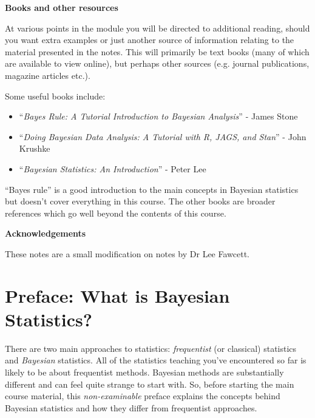 \clearpage
\noindent \textbf{\color{verydarkred}Books and other resources}

At various points in the module you will be directed to additional reading, should you want extra examples or just another source of information relating to the material presented in the notes.  This will primarily be text books (many of which are available to view online), but perhaps other sources (e.g. journal publications, magazine articles etc.).  

\noindent Some useful books include:
\begin{itemize}
\item ``\textit{Bayes Rule: A Tutorial Introduction to Bayesian Analysis}'' - James Stone
\item ``\textit{Doing Bayesian Data Analysis: A Tutorial with R, JAGS, and Stan}'' - John Krushke
\item ``\textit{Bayesian Statistics: An Introduction}'' - Peter Lee
\end{itemize}
``Bayes rule'' is a good introduction to the main concepts in Bayesian statistics but doesn't cover everything in this course.
The other books are broader references which go well beyond the contents of this course.

\noindent \textbf{\color{verydarkred}Acknowledgements}

These notes are a small modification on notes by Dr Lee Fawcett.


\chapter*{Preface: What is Bayesian Statistics?}

There are two main approaches to statistics: \emph{frequentist} (or classical) statistics and \emph{Bayesian} statistics.
All of the statistics teaching you've encountered so far is likely to be about frequentist methods.
Bayesian methods are substantially different and can feel quite strange to start with.
So, before starting the main course material, this \emph{non-examinable} preface explains the concepts behind Bayesian statistics and how they differ from frequentist approaches.

